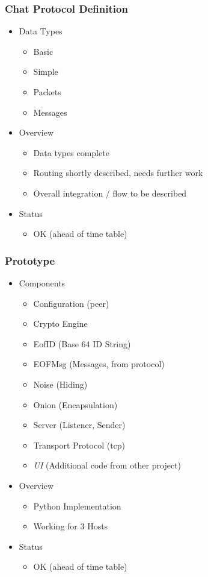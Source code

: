 \documentclass{beamer}
\begin{document}
\frame
{
  \frametitle{Chat Protocol Definition}
  \begin{itemize}
      \item Data Types 
      \begin{itemize}
          \item Basic
          \item Simple
          \item Packets
          \item Messages
      \end{itemize}
      \item Overview
      \begin{itemize}
          \item Data types complete
          \item Routing shortly described, needs further work
          \item Overall integration / flow to be described
      \end{itemize}
      \item Status
      \begin{itemize}
          \item OK (ahead of time table)
      \end{itemize}
  \end{itemize}
}

\frame
{
  \frametitle{Prototype}
  \begin{itemize}
      \item Components
      \begin{itemize}
          \item Configuration (peer)
          \item Crypto Engine
          \item EofID (Base 64 ID String)
          \item EOFMsg (Messages, from protocol)
          \item Noise (Hiding)
          \item Onion (Encapsulation)
          \item Server (Listener, Sender)
          \item Transport Protocol (tcp)
          \item \textit{UI} (Additional code from other project)
      \end{itemize}
      \item Overview
      \begin{itemize}
          \item Python Implementation
          \item Working for 3 Hosts
      \end{itemize}
      \item Status
      \begin{itemize}
          \item OK (ahead of time table)
      \end{itemize}
  \end{itemize}
}
\end{document}
